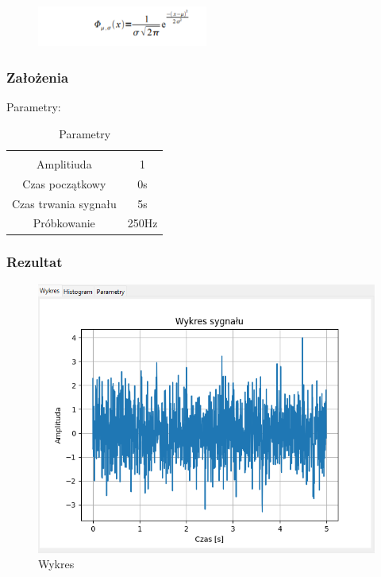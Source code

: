 \documentclass{article}
\begin{document}
        \begin{figure}[!htbp]
            \centering
            \includegraphics[width=0.5\textwidth]{img/szumgauss.png}
        \end{figure}
        \subsubsection{Założenia}
        \noindent
        Parametry:
        \begin{table}[h!]
            \centering
            \vspace{0.2cm}
            \begin{tabular}{|c|c|}
                \hline\hline\\[-0.4cm]
                Amplitiuda & 1  \\
                \hline
                Czas początkowy & 0s  \\
                \hline
                Czas trwania sygnału & 5s  \\
                \hline
                Próbkowanie & 250Hz \\
                \hline
            \end{tabular}
            \caption{Parametry}
            \label{szumgaussowski}
        \end{table}
    \subsubsection{Rezultat}
        \begin{figure}[h!]
            \centering
            \includegraphics[width=\textwidth]{img/szum-gauss/wykres.png}
            \caption{Wykres}
        \end{figure}
\end{document}
